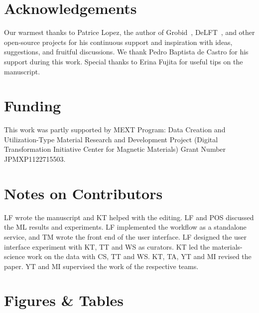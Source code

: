 \documentclass[]{interact}
\theoremstyle{plain} %
\theoremstyle{definition}
\theoremstyle{remark}
\begin{document}
\section*{Acknowledgements}
Our warmest thanks to Patrice Lopez, the author of Grobid~\cite{GROBID}, DeLFT~\cite{DeLFT}, and other open-source projects for his continuous support and inspiration with ideas, suggestions, and fruitful discussions.
We thank Pedro Baptista de Castro for his support during this work. 
Special thanks to Erina Fujita for useful tips on the manuscript. 


\section*{Funding}
This work was partly supported by MEXT Program: Data Creation and Utilization-Type Material Research and Development Project (Digital Transformation Initiative Center for Magnetic Materials) Grant Number JPMXP1122715503.


\section*{Notes on Contributors}
LF wrote the manuscript and KT helped with the editing. 
LF and POS discussed the ML results and experiments. 
LF implemented the workflow as a standalone service, and TM wrote the front end of the user interface. 
LF designed the user interface experiment with KT, TT and WS as curators.
KT led the materials-science work on the data with CS, TT and WS.
KT, TA, YT and MI revised the paper.
YT and MI supervised the work of the respective teams. 





\section*{Figures \& Tables}

\end{document}
